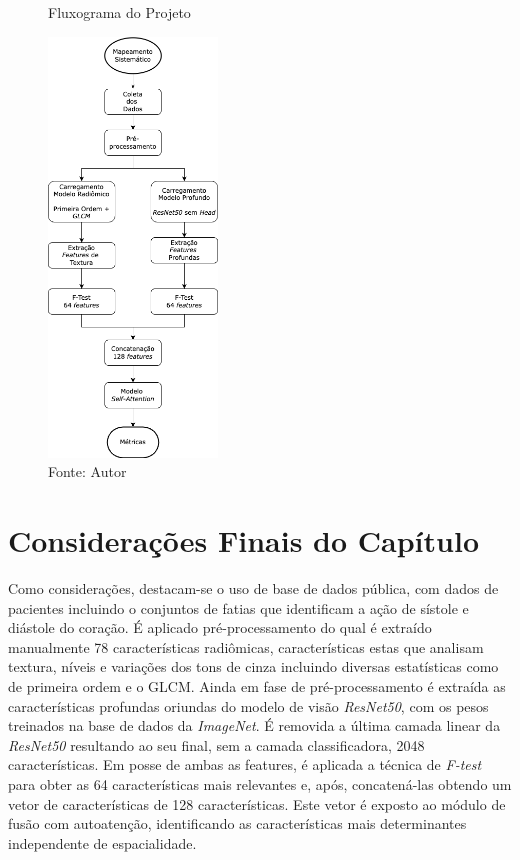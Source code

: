 \begin{figure}[htbp]
    \centering
    \caption{Fluxograma do Projeto}
    \includegraphics[width=0.4\textwidth]{figures/fig015.png}
    \caption*{Fonte: Autor}
    \label{fig:fig015}
\end{figure}



\section{Considerações Finais do Capítulo}
\label{sec:cap4_consideracoes_finais}

Como considerações, destacam-se o uso de base de dados pública, com dados de pacientes incluindo o conjuntos de fatias que identificam a ação de sístole e diástole do coração. É aplicado pré-processamento do qual é extraído manualmente 78 características radiômicas, características estas que analisam textura, níveis e variações dos tons de cinza incluindo diversas estatísticas como de primeira ordem e o \gls{GLCM}. Ainda em fase de pré-processamento é extraída as características profundas oriundas do modelo de visão \textit{ResNet50}, com os pesos treinados na base de dados da \textit{ImageNet}. É removida a última camada linear da \textit{ResNet50} resultando ao seu final, sem a camada classificadora, 2048 características. Em posse de ambas as features, é aplicada a técnica de \textit{F-test} para obter as 64 características mais relevantes e, após, concatená-las obtendo um vetor de características de 128 características. Este vetor é exposto ao módulo de fusão com autoatenção, identificando as características mais determinantes independente de espacialidade. 